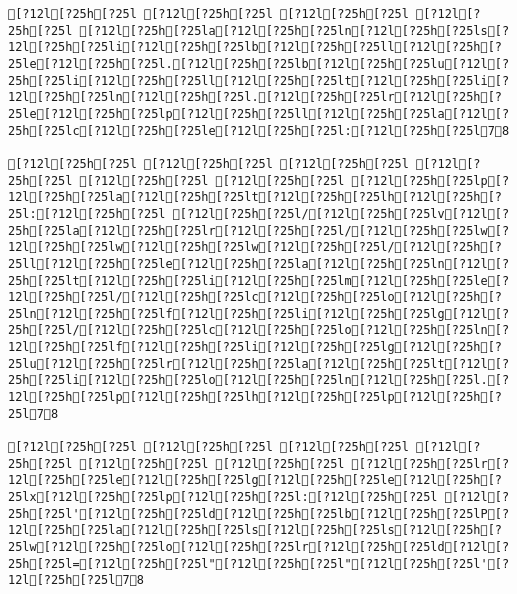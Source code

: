 \documentclass{scrartcl}
\begin{document}
\begin{Verbatim}
[?12l[?25h[?25l [?12l[?25h[?25l [?12l[?25h[?25l [?12l[?25h[?25l [?12l[?25h[?25la[?12l[?25h[?25ln[?12l[?25h[?25ls[?12l[?25h[?25li[?12l[?25h[?25lb[?12l[?25h[?25ll[?12l[?25h[?25le[?12l[?25h[?25l.[?12l[?25h[?25lb[?12l[?25h[?25lu[?12l[?25h[?25li[?12l[?25h[?25ll[?12l[?25h[?25lt[?12l[?25h[?25li[?12l[?25h[?25ln[?12l[?25h[?25l.[?12l[?25h[?25lr[?12l[?25h[?25le[?12l[?25h[?25lp[?12l[?25h[?25ll[?12l[?25h[?25la[?12l[?25h[?25lc[?12l[?25h[?25le[?12l[?25h[?25l:[?12l[?25h[?25l78

[?12l[?25h[?25l [?12l[?25h[?25l [?12l[?25h[?25l [?12l[?25h[?25l [?12l[?25h[?25l [?12l[?25h[?25l [?12l[?25h[?25lp[?12l[?25h[?25la[?12l[?25h[?25lt[?12l[?25h[?25lh[?12l[?25h[?25l:[?12l[?25h[?25l [?12l[?25h[?25l/[?12l[?25h[?25lv[?12l[?25h[?25la[?12l[?25h[?25lr[?12l[?25h[?25l/[?12l[?25h[?25lw[?12l[?25h[?25lw[?12l[?25h[?25lw[?12l[?25h[?25l/[?12l[?25h[?25ll[?12l[?25h[?25le[?12l[?25h[?25la[?12l[?25h[?25ln[?12l[?25h[?25lt[?12l[?25h[?25li[?12l[?25h[?25lm[?12l[?25h[?25le[?12l[?25h[?25l/[?12l[?25h[?25lc[?12l[?25h[?25lo[?12l[?25h[?25ln[?12l[?25h[?25lf[?12l[?25h[?25li[?12l[?25h[?25lg[?12l[?25h[?25l/[?12l[?25h[?25lc[?12l[?25h[?25lo[?12l[?25h[?25ln[?12l[?25h[?25lf[?12l[?25h[?25li[?12l[?25h[?25lg[?12l[?25h[?25lu[?12l[?25h[?25lr[?12l[?25h[?25la[?12l[?25h[?25lt[?12l[?25h[?25li[?12l[?25h[?25lo[?12l[?25h[?25ln[?12l[?25h[?25l.[?12l[?25h[?25lp[?12l[?25h[?25lh[?12l[?25h[?25lp[?12l[?25h[?25l78

[?12l[?25h[?25l [?12l[?25h[?25l [?12l[?25h[?25l [?12l[?25h[?25l [?12l[?25h[?25l [?12l[?25h[?25l [?12l[?25h[?25lr[?12l[?25h[?25le[?12l[?25h[?25lg[?12l[?25h[?25le[?12l[?25h[?25lx[?12l[?25h[?25lp[?12l[?25h[?25l:[?12l[?25h[?25l [?12l[?25h[?25l'[?12l[?25h[?25ld[?12l[?25h[?25lb[?12l[?25h[?25lP[?12l[?25h[?25la[?12l[?25h[?25ls[?12l[?25h[?25ls[?12l[?25h[?25lw[?12l[?25h[?25lo[?12l[?25h[?25lr[?12l[?25h[?25ld[?12l[?25h[?25l=[?12l[?25h[?25l"[?12l[?25h[?25l"[?12l[?25h[?25l'[?12l[?25h[?25l78


\end{Verbatim}
\end{document}
